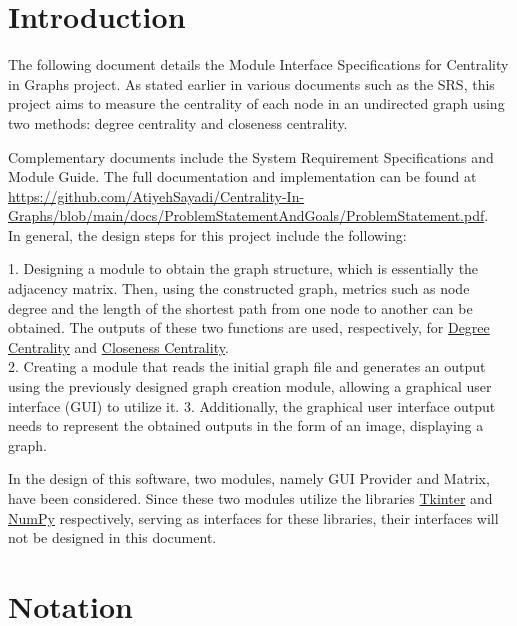 \documentclass[12pt, titlepage]{article}
\begin{document}
\section{Introduction}

The following document details the Module Interface Specifications for Centrality in Graphs project. As stated earlier in various documents such as the SRS, this project aims to measure the centrality of each node in an undirected graph using two methods: degree centrality and closeness centrality.

Complementary documents include the System Requirement Specifications
and Module Guide.  The full documentation and implementation can be
found at \url{https://github.com/AtiyehSayadi/Centrality-In-Graphs/blob/main/docs/ProblemStatementAndGoals/ProblemStatement.pdf}. \\
In general, the design steps for this project include the following:

1. Designing a module to obtain the graph structure, which is essentially the adjacency matrix. Then, using the constructed graph, metrics such as node degree and the length of the shortest path from one node to another can be obtained. The outputs of these two functions are used, respectively, for \href{https://towardsdatascience.com/graph-analytics-introduction-and-concepts-of-centrality-8f5543b55de3}{Degree Centrality} and \href{https://www.geeksforgeeks.org/closeness-centrality-centrality-measure/}{Closeness Centrality}.\\
2. Creating a module that reads the initial graph file and generates an output using the previously designed graph creation module, allowing a graphical user interface (GUI) to utilize it.
3. Additionally, the graphical user interface output needs to represent the obtained outputs in the form of an image, displaying a graph.

In the design of this software, two modules, namely GUI Provider and Matrix, have been considered. Since these two modules utilize the libraries \href{https://docs.python.org/3/library/tk.html}{Tkinter} and \href{https://numpy.org/}{NumPy} respectively, serving as interfaces for these libraries, their interfaces will not be designed in this document.

\section{Notation}
\end{document}
